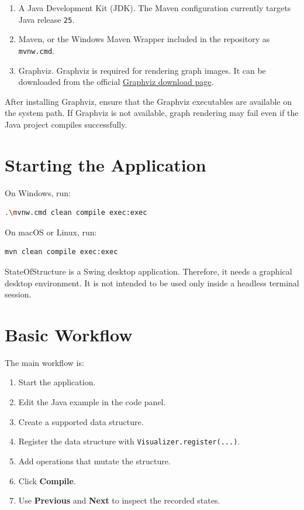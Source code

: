 \documentclass[12pt,a4paper]{article}
\begin{document}
\begin{enumerate}
    \item A Java Development Kit (JDK). The Maven configuration currently targets Java release \texttt{25}.
    \item Maven, or the Windows Maven Wrapper included in the repository as \texttt{mvnw.cmd}.
    \item Graphviz. Graphviz is required for rendering graph images. It can be downloaded from the official \href{https://graphviz.org/download/}{Graphviz download page}.
\end{enumerate}

After installing Graphviz, ensure that the Graphviz executables are available on the system path. If Graphviz is not available, graph rendering may fail even if the Java project compiles successfully.

\section{Starting the Application}

On Windows, run:

\begin{lstlisting}[language=bash]
.\mvnw.cmd clean compile exec:exec
\end{lstlisting}

On macOS or Linux, run:

\begin{lstlisting}[language=bash]
mvn clean compile exec:exec
\end{lstlisting}

StateOfStructure is a Swing desktop application. Therefore, it needs a graphical desktop environment. It is not intended to be used only inside a headless terminal session.

\section{Basic Workflow}

The main workflow is:

\begin{enumerate}
    \item Start the application.
    \item Edit the Java example in the code panel.
    \item Create a supported data structure.
    \item Register the data structure with \texttt{Visualizer.register(...)}.
    \item Add operations that mutate the structure.
    \item Click \textbf{Compile}.
    \item Use \textbf{Previous} and \textbf{Next} to inspect the recorded states.
\end{enumerate}
\end{document}
